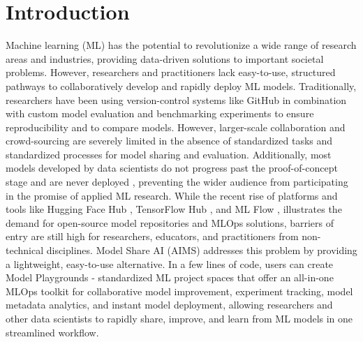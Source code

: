\section{Introduction}
Machine learning (ML) has the potential to revolutionize a wide range of research areas and industries, providing data-driven solutions to important societal problems. However, researchers and practitioners lack easy-to-use, structured pathways to collaboratively develop and rapidly deploy ML models. Traditionally, researchers have been using version-control systems like GitHub in combination with custom model evaluation and benchmarking experiments to ensure reproducibility and to compare models. However, larger-scale collaboration and crowd-sourcing are severely limited in the absence of standardized tasks and standardized processes for model sharing and evaluation. Additionally, most models developed by data scientists do not progress past the proof-of-concept stage and are never deployed \citep{davenport_is_2022, siegel_models_2022}, preventing the wider audience from participating in the promise of applied ML research. While the recent rise of platforms and tools like Hugging Face Hub \citep{noauthor_hugging_2023}, TensorFlow Hub \citep{noauthor_tensorflow_2023}, and ML Flow \citep{chen_developments_2020, noauthor_mlflow_2023, zaharia_accelerating_2018}, illustrates the demand for open-source model repositories and MLOps solutions, barriers of entry are still high for researchers, educators, and practitioners from non-technical disciplines. Model Share AI (AIMS) addresses this problem by providing a lightweight, easy-to-use alternative. In a few lines of code, users can create Model Playgrounds - standardized ML project spaces that offer an all-in-one MLOps toolkit for collaborative model improvement, experiment tracking, model metadata analytics, and instant model deployment, allowing researchers and other data scientists to rapidly share, improve, and learn from ML models in one streamlined workflow.


